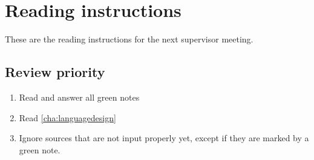 \chapter{Reading instructions}
These are the reading instructions for the next supervisor meeting. 

\section{Review priority}
\begin{enumerate}
    \item Read and answer all green notes
    \item Read \ref{cha:languagedesign}
    \item Ignore sources that are not input properly yet, except if they are marked by a green note. 
\end{enumerate}